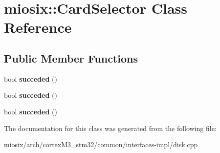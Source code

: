\hypertarget{classmiosix_1_1_card_selector}{\section{miosix\-:\-:Card\-Selector Class Reference}
\label{classmiosix_1_1_card_selector}
}
\subsection*{Public Member Functions}
\begin{DoxyCompactItemize}
\item 
\hypertarget{classmiosix_1_1_card_selector_a2d174ffa538ccb586fd18e3e8dbec5dd}{bool {\bfseries succeded} ()}\label{classmiosix_1_1_card_selector_a2d174ffa538ccb586fd18e3e8dbec5dd}

\item 
\hypertarget{classmiosix_1_1_card_selector_a2d174ffa538ccb586fd18e3e8dbec5dd}{bool {\bfseries succeded} ()}\label{classmiosix_1_1_card_selector_a2d174ffa538ccb586fd18e3e8dbec5dd}

\item 
\hypertarget{classmiosix_1_1_card_selector_a2d174ffa538ccb586fd18e3e8dbec5dd}{bool {\bfseries succeded} ()}\label{classmiosix_1_1_card_selector_a2d174ffa538ccb586fd18e3e8dbec5dd}

\end{DoxyCompactItemize}


The documentation for this class was generated from the following file\-:\begin{DoxyCompactItemize}
\item 
miosix/arch/cortex\-M3\-\_\-stm32/common/interfaces-\/impl/disk.\-cpp\end{DoxyCompactItemize}
